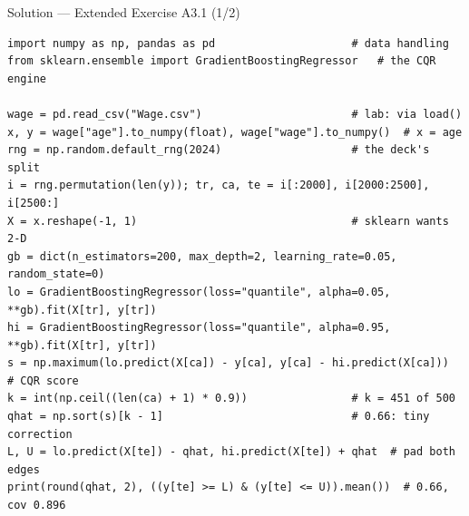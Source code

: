 \documentclass[aspectratio=169,11pt]{beamer}
\begin{document}
\begin{frame}[fragile]{Solution --- Extended Exercise A3.1 (1/2)}
\begin{solutionbox}
\begin{lstlisting}[basicstyle=\ttfamily\scriptsize]
import numpy as np, pandas as pd                     # data handling
from sklearn.ensemble import GradientBoostingRegressor   # the CQR engine

wage = pd.read_csv("Wage.csv")                       # lab: via load()
x, y = wage["age"].to_numpy(float), wage["wage"].to_numpy()  # x = age
rng = np.random.default_rng(2024)                    # the deck's split
i = rng.permutation(len(y)); tr, ca, te = i[:2000], i[2000:2500], i[2500:]
X = x.reshape(-1, 1)                                 # sklearn wants 2-D
gb = dict(n_estimators=200, max_depth=2, learning_rate=0.05, random_state=0)
lo = GradientBoostingRegressor(loss="quantile", alpha=0.05, **gb).fit(X[tr], y[tr])
hi = GradientBoostingRegressor(loss="quantile", alpha=0.95, **gb).fit(X[tr], y[tr])
s = np.maximum(lo.predict(X[ca]) - y[ca], y[ca] - hi.predict(X[ca]))  # CQR score
k = int(np.ceil((len(ca) + 1) * 0.9))                # k = 451 of 500
qhat = np.sort(s)[k - 1]                             # 0.66: tiny correction
L, U = lo.predict(X[te]) - qhat, hi.predict(X[te]) + qhat  # pad both edges
print(round(qhat, 2), ((y[te] >= L) & (y[te] <= U)).mean())  # 0.66, cov 0.896
\end{lstlisting}
\end{solutionbox}
\end{frame}
\end{document}
